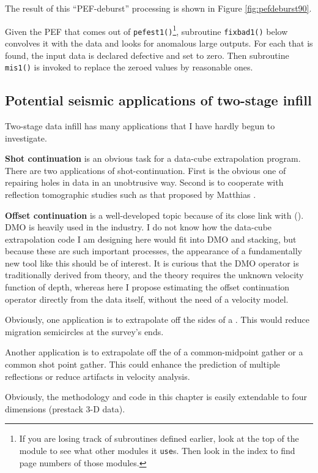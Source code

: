 The result of this ``PEF-deburst'' processing
is shown in Figure \ref{fig:pefdeburst90}.
\par
Given the PEF that comes out of \texttt{pefest1()}\footnote{
        If you are losing track of subroutines defined earlier,
        look at the top of the module to see what other modules
        it \texttt{use}s.
        Then look in the index to find page numbers of those modules.
        }, subroutine
\texttt{fixbad1()} below convolves it with the data and looks for
anomalous large outputs.  For each that is found, the input data is
declared defective and set to zero.  Then subroutine \texttt{mis1()}
 is invoked to replace the zeroed values by
reasonable ones.



\subsection{Potential seismic applications of two-stage infill}
Two-stage data infill has many applications
that I have hardly begun to investigate.
\par {\bf Shot continuation}
is an obvious task for a data-cube extrapolation program.
There are two applications of shot-continuation.
First is the obvious one of repairing holes in data
in an unobtrusive way.
Second is to cooperate with reflection tomographic studies
such as that proposed by Matthias .
\par {\bf Offset continuation} is a well-developed topic because
of its close link with  ().
DMO is heavily used in the industry.
I do not know how the data-cube extrapolation code I
am designing here would fit into DMO and stacking,
but because these are such important processes,
the appearance of a fundamentally new tool like
this should be of interest.
It is curious that the DMO operator is traditionally
derived from theory, and the theory requires the
unknown velocity function of depth, whereas here
I propose estimating the offset continuation operator
directly from the data itself, without the need of a velocity model.
\par
Obviously, one application is to extrapolate off the sides of a
.
This would reduce migration semicircles
at the survey's ends.
\par
Another application is to extrapolate off the
of a common-midpoint gather or
a common shot point gather.
This could enhance
the prediction of
multiple reflections
or reduce artifacts in velocity analysis.
\par
Obviously, the methodology and code in this chapter
is easily extendable to four dimensions (prestack 3-D data).
%


